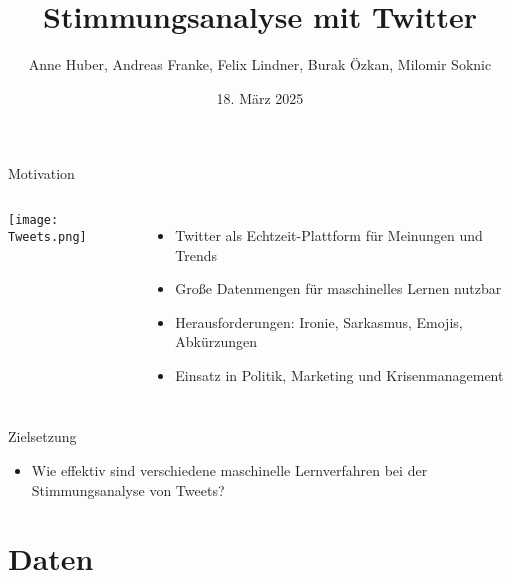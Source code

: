\documentclass[aspectratio=169]{beamer} %
\title{Stimmungsanalyse mit Twitter}
\author[Team Twitter Sentiment]{Anne Huber, Andreas Franke, Felix Lindner, Burak Özkan, Milomir Soknic}
\institute{Projektpraktikum Web Science,\\Artificial Intelligence Group,\\Universität Hagen, Deutschland}
\date{18. März 2025}
\begin{document}
\begin{frame}
  \titlepage
\end{frame}


\begin{frame}{Motivation}
  \begin{columns}
    \centering
    \texttt{[image: Tweets.png]}

    \begin{itemize}
        \item Twitter als Echtzeit-Plattform für Meinungen und Trends
        \item Große Datenmengen für maschinelles Lernen nutzbar
        \item Herausforderungen: Ironie, Sarkasmus, Emojis, Abkürzungen
        \item Einsatz in Politik, Marketing und Krisenmanagement
    \end{itemize}
  \end{columns}
\end{frame}

\begin{frame}{Zielsetzung}
  \Large
  \begin{itemize}
      \item Wie effektiv sind verschiedene maschinelle Lernverfahren bei der Stimmungsanalyse von Tweets?
  \end{itemize}
\end{frame}

\section{Daten}
\end{document}

